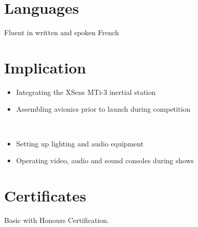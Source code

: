 \documentclass[11pt,letterpaper,sans]{moderncv}        %
\begin{document}
\section{Languages}
 {Fluent in written and spoken French} {}


\section{Implication}
{%
\begin{itemize}%
 \item Integrating the XSens MTi-3 inertial station%
 \item Assembling avionics prior to launch during competition%
\end{itemize}}
\ \\
{%
\begin{itemize}%
 \item Setting up lighting and audio equipment%
 \item Operating video, audio and sound consoles during shows%
\end{itemize}}


\section{Certificates}
{%
Basic with Honours Certification.
}
\end{document}
